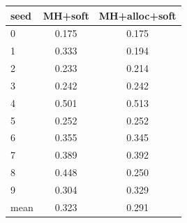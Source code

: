 \begin{tabular}{lcc}
\toprule
seed & MH+soft & MH+alloc+soft \\
\midrule
0 & 0.175 & 0.175 \\
1 & 0.333 & 0.194 \\
2 & 0.233 & 0.214 \\
3 & 0.242 & 0.242 \\
4 & 0.501 & 0.513 \\
5 & 0.252 & 0.252 \\
6 & 0.355 & 0.345 \\
7 & 0.389 & 0.392 \\
8 & 0.448 & 0.250 \\
9 & 0.304 & 0.329 \\
\midrule
mean & 0.323 & 0.291 \\
\bottomrule
\end{tabular}